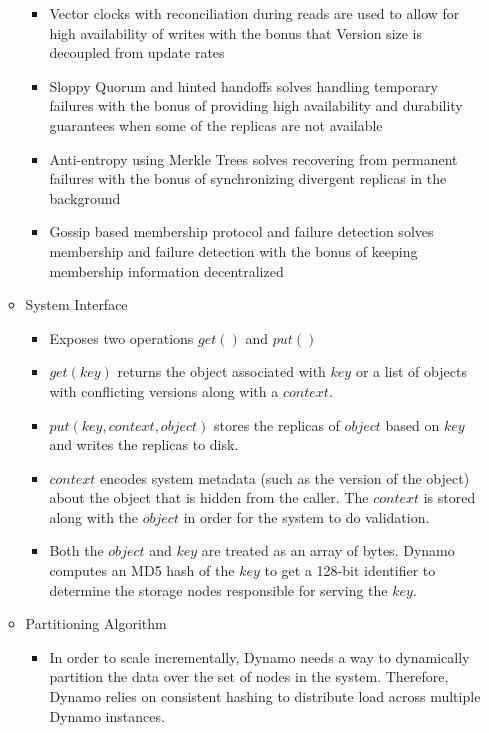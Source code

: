 \documentclass[a4paper]{article}
\begin{document}
\begin{itemize}
\begin{itemize}
\begin{itemize}
\item Vector clocks with reconciliation during reads are used to allow for high availability of writes with the bonus that Version size is decoupled from update rates

\item Sloppy Quorum and hinted handoffs solves handling temporary failures with the bonus of providing high availability and durability guarantees when some of the replicas are not available

\item Anti-entropy using Merkle Trees solves recovering from permanent failures with the bonus of synchronizing divergent replicas in the background

\item Gossip based membership protocol and failure detection solves membership and failure detection with the bonus of keeping membership information decentralized
\end{itemize}

\item System Interface
\begin{itemize}
\item Exposes two operations $get()$ and $put()$

\item $get(key)$ returns the object associated with $key$ or a list of objects with conflicting versions along with a $context$.

\item $put(key, context, object)$ stores the replicas of $object$ based on $key$ and writes the replicas to disk. 

\item $context$ encodes system metadata (such as the version of the object) about the object that is hidden from the caller. The $context$ is stored along with the $object$ in order for the system to do validation.

\item Both the $object$ and $key$ are treated as an array of bytes. Dynamo computes an MD5 hash of the $key$ to get a 128-bit identifier to determine the storage nodes responsible for serving the $key$. 
\end{itemize}

\item Partitioning Algorithm
\begin{itemize}
\item In order to scale incrementally, Dynamo needs a way to dynamically partition the data over the set of nodes in the system. Therefore, Dynamo relies on consistent hashing to distribute load across multiple Dynamo instances.


\end{itemize}
\end{itemize}
\end{itemize}
\end{document}
